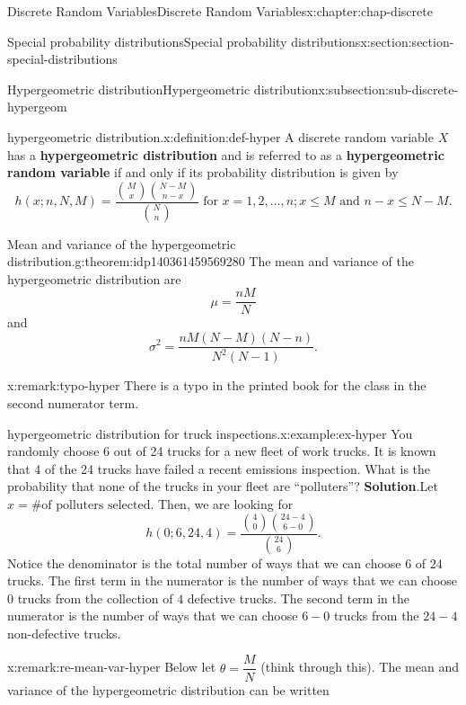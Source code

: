 \documentclass[oneside,10pt,]{book}
\newcommand{\blocktitlefont}{\relax}
\newcommand{\terminology}[1]{\textbf{#1}}
\numberwithin{equation}{section}
\begin{document}
\begin{chapterptx}{Discrete Random Variables}{}{Discrete Random Variables}{}{}{x:chapter:chap-discrete}
\begin{sectionptx}{Special probability distributions}{}{Special probability distributions}{}{}{x:section:section-special-distributions}
\begin{subsectionptx}{Hypergeometric distribution}{}{Hypergeometric distribution}{}{}{x:subsection:sub-discrete-hypergeom}
\begin{definition}{hypergeometric distribution.}{x:definition:def-hyper}%
A discrete random variable \(\displaystyle X\) has a \terminology{hypergeometric distribution} and is referred to as a \terminology{hypergeometric random variable} if and only if its probability distribution is given by%
\begin{equation*}
h(x; n, N, M) = \dfrac{{M \choose x}{N-M
\choose{n-x}}}{{N \choose n}}
\text{ for }x = 1, 2, \dots, n; x \le M \text{ and } n-x \le N-M\text{.}
\end{equation*}
%
\end{definition}
\begin{theorem}{Mean and variance of the hypergeometric distribution.}{}{g:theorem:idp140361459569280}%
The mean and variance of the hypergeometric distribution are%
\begin{equation*}
\mu =
\frac{nM}{N}
\end{equation*}
and%
\begin{equation*}
\sigma^2 =
\frac{nM(N-M)(N-n)}{N^2(N-1)}\text{.}
\end{equation*}
%
\end{theorem}
\begin{remark}{}{x:remark:typo-hyper}%
There is a typo in the printed book for the class in the second numerator term.%
\end{remark}
\begin{example}{hypergeometric distribution for truck inspections.}{x:example:ex-hyper}%
You randomly choose 6 out of 24 trucks for a new fleet of work trucks.  It is known that 4 of the 24 trucks have failed a recent emissions inspection. What is the probability that none of the trucks in your fleet are ``polluters''?%
\textbf{\blocktitlefont Solution}.\quad{}Let \(x = \text{\# of polluters selected}\).  Then, we are looking for%
\begin{equation*}
h(0; 6, 24, 4) = \dfrac{{4 \choose 0}{24-4 \choose{6-0}}}{{24 \choose
6}}\text{.}
\end{equation*}
Notice the denominator is the total number of ways that we can choose \(6\) of \(24\) trucks.  The first term in the numerator is the number of ways that we can choose \(0\) trucks from the collection of \(4\) defective trucks.   The second term in the numerator is the number of ways that we can choose \(6-0\) trucks from the \(24-4\) non-defective trucks.%
\end{example}
\begin{remark}{}{x:remark:re-mean-var-hyper}%
Below let \(\theta = \dfrac{M}{N}\) (think through this). The mean and variance of the hypergeometric distribution can be written%

\end{remark}
\end{subsectionptx}
\end{sectionptx}
\end{chapterptx}
\end{document}
